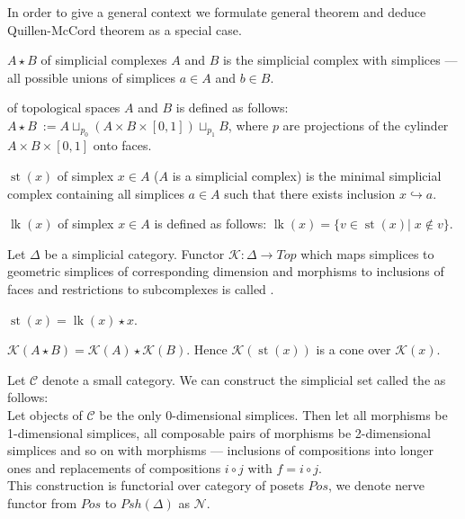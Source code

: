 In order to give a general context we formulate general theorem and deduce Quillen-McCord theorem as a special case.\\

\begin{definition}
   $A \star B$ of simplicial complexes $A$ and $B$ is the simplicial complex with simplices --- all possible unions of simplices $a \in A$ and $b \in B$.
\end{definition}

\begin{definition}
   of topological spaces $A$ and $B$ is defined as follows: $A \star B\ := A \sqcup_{p_0} (A \times B \times [0,1]) \sqcup_{p_1} B$, where $p$ are projections of the cylinder $A \times B \times [0,1]$ onto faces.
\end{definition}

\begin{definition}
   $\operatorname{st}(x)$ of simplex $x \in A$ ($A$ is a simplicial complex) is the minimal simplicial complex containing all simplices $a \in A$ such that there exists inclusion $x \hookrightarrow a$.
\end{definition}

\begin{definition}
   $\operatorname{lk}(x)$ of simplex $x \in A$ is defined as follows: $\operatorname{lk}(x) = \{v \in \operatorname{st}(x)|\; x \not\in v\}$.
\end{definition}

\begin{definition}
  Let $\Delta$ be a simplicial category. Functor $\mathcal{K} : \Delta \to Top$ which maps simplices to geometric simplices of corresponding dimension and morphisms to inclusions of faces and restrictions to subcomplexes is called .
\end{definition}

\begin{proposition}
  $\operatorname{st}(x) = \operatorname{lk}(x) \star x$.
\end{proposition}

\begin{proposition}
  $\mathcal{K}(A \star B) = \mathcal{K}(A) \star \mathcal{K}(B)$. Hence $\mathcal{K}(\operatorname{st}(x))$ is a cone over $\mathcal{K}(x)$.
\end{proposition}

Let $\mathcal{C}$ denote a small category. We can construct the simplicial set called the  as follows:\\
Let objects of $\mathcal{C}$ be the only 0-dimensional simplices. Then let all morphisms be 1-dimensional simplices, all composable pairs of morphisms be 2-dimensional simplices and so on with morphisms --- inclusions of compositions into longer ones and replacements of compositions $i \circ j$ with $f = i \circ j$.\\
This construction is functorial over category of posets $Pos$, we denote nerve functor from $Pos$ to $Psh(\Delta)$ as $\mathcal{N}$.

